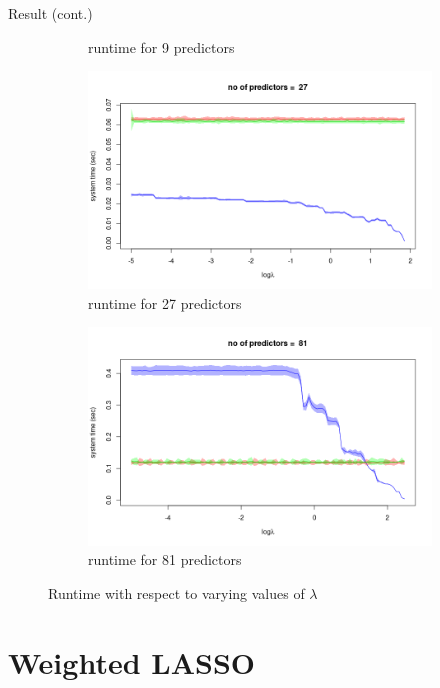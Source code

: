 \documentclass[tikz]{beamer}					%
\begin{document}
{\begin{frame}{Result (cont.)}
\begin{figure}
\begin{subfigure}{.5\textwidth}
  \caption{runtime for 9 predictors}
\end{subfigure}
\begin{subfigure}{.5\textwidth}
  \centering
  \includegraphics[width=.8\linewidth]{figures/lamb_3.png}
  \caption{runtime for 27 predictors}
\end{subfigure}%
\begin{subfigure}{.5\textwidth}
  \centering
  \includegraphics[width=.8\linewidth]{figures/lamb_4.png}
  \caption{runtime for 81 predictors}
\end{subfigure}
\caption{Runtime with respect to varying values of $\lambda$}
\end{figure}
\end{frame}
}

\section{Weighted LASSO}
\end{document}
